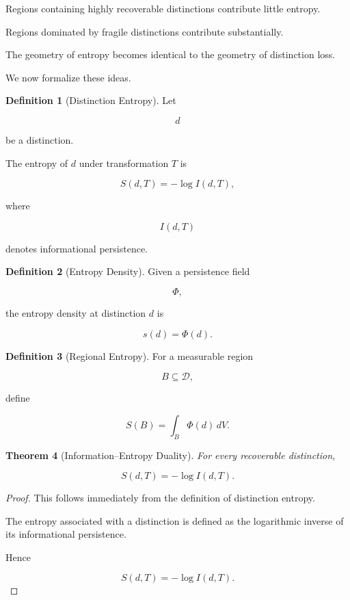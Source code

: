 \documentclass[12pt,oneside]{article}
\newtheorem{theorem}{Theorem}[section] \newtheorem{lemma}[theorem]{Lemma} \newtheorem{proposition}[theorem]{Proposition} \newtheorem{corollary}[theorem]{Corollary}
\theoremstyle{definition}
\newtheorem{definition}[theorem]{Definition} \newtheorem{axiom}[theorem]{Axiom} \newtheorem{remark}[theorem]{Remark} \newtheorem{example}[theorem]{Example}
\begin{document}
Regions containing highly recoverable distinctions contribute little entropy.

Regions dominated by fragile distinctions contribute substantially.

The geometry of entropy becomes identical to the geometry of distinction loss.

We now formalize these ideas.

\begin{definition}[Distinction Entropy]

Let

\[
d
\]

be a distinction.

The entropy of \(d\) under transformation \(T\) is

\[
S(d,T)
=
-\log I(d,T),
\]

where

\[
I(d,T)
\]

denotes informational persistence.

\end{definition}

\begin{definition}[Entropy Density]

Given a persistence field

\[
\Phi,
\]

the entropy density at distinction \(d\) is

\[
s(d)
=
\Phi(d).
\]

\end{definition}

\begin{definition}[Regional Entropy]

For a measurable region

\[
B
\subseteq
\mathcal D,
\]

define

\[
S(B)
=
\int_B
\Phi(d)\,dV.
\]

\end{definition}

\begin{theorem}[Information–Entropy Duality]

For every recoverable distinction,

\[
S(d,T)
=
-\log I(d,T).
\]

\end{theorem}

\begin{proof}

This follows immediately from the definition of distinction entropy.

The entropy associated with a distinction is defined as the logarithmic inverse of its informational persistence.

Hence

\[
S(d,T)
=
-\log I(d,T).
\]

\end{proof}
\end{document}
